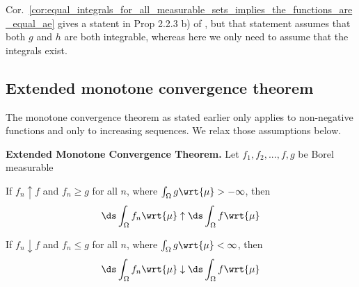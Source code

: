 \documentclass{article} %
\newcommand{\dmu}{\wrt{\mu}}
\begin{document}
\begin{remark}
Cor.~\ref{cor:equal_integrals_for_all_measurable_sets_implies_the_functions_are_equal_ae} gives a statent in Prop 2.2.3 b) of \cite{folland1999real}, but that statement assumes that both $g$ and $h$ are both integrable, whereas here we only need to assume that the integrals exist.  	
\end{remark}


\subsection{Extended monotone convergence theorem}


The monotone convergence theorem as stated earlier only applies to non-negative functions and only to increasing sequences. We relax those assumptions below.

\begin{theorem}{\textbf{Extended Monotone Convergence Theorem.}}
Let $f_1, f_2, ..., f, g$ be Borel measurable
\begin{alphabate}
\item If $f_n \uparrow f$ and $f_n \geq g$ for all $n$, where $\int_\Omega g \dmu > -\infty$, then 
\[ \ds\int_\Omega f_n \dmu \uparrow \ds\int_\Omega f \dmu  \]
\item If $f_n \downarrow f$ and $f_n \leq g$ for all $n$, where $\int_\Omega g \dmu < \infty$, then 
\[ \ds\int_\Omega f_n \dmu \downarrow \ds\int_\Omega f \dmu  \]	
\end{alphabate}
\label{thm:extended_monotone_convergence_theorem}
\end{theorem}
\end{document}
